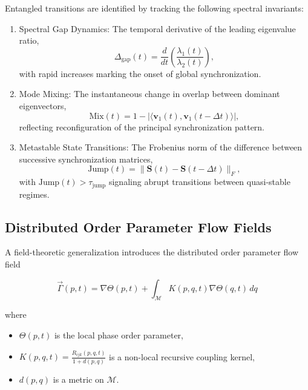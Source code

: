 Entangled transitions are identified by tracking the following spectral invariants:

\begin{enumerate}
    \item Spectral Gap Dynamics: The temporal derivative of the leading eigenvalue ratio,
    \begin{equation}
    \Delta_{\text{gap}}(t) = \frac{d}{dt}\left(\frac{\lambda_1(t)}{\lambda_2(t)}\right),
    \end{equation}
    with rapid increases marking the onset of global synchronization.

    \item Mode Mixing: The instantaneous change in overlap between dominant eigenvectors,
    \begin{equation}
    \text{Mix}(t) = 1 - |\langle \mathbf{v}_1(t), \mathbf{v}_1(t-\Delta t) \rangle|,
    \end{equation}
    reflecting reconfiguration of the principal synchronization pattern.

    \item Metastable State Transitions: The Frobenius norm of the difference between successive synchronization matrices,
    \begin{equation}
    \text{Jump}(t) = \|\mathbf{S}(t) - \mathbf{S}(t-\Delta t)\|_F,
    \end{equation}
    with \(\text{Jump}(t) > \tau_{\text{jump}}\) signaling abrupt transitions between quasi-stable regimes.
\end{enumerate}

\subsection{Distributed Order Parameter Flow Fields}

A field-theoretic generalization introduces the distributed order parameter flow field

\begin{equation}
\vec{\Gamma}(p,t) = \nabla \Theta(p,t) + \int_{\mathcal{M}} K(p,q,t) \nabla \Theta(q,t) \, dq
\end{equation}

where
\begin{itemize}
    \item \(\Theta(p,t)\) is the local phase order parameter,
    \item \(K(p,q,t) = \frac{R_{ijk}(p,q,t)}{1 + d(p,q)}\) is a non-local recursive coupling kernel,
    \item \(d(p,q)\) is a metric on \(\mathcal{M}\).
\end{itemize}


